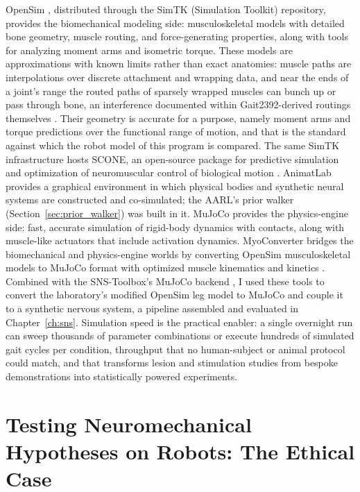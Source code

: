 OpenSim \citep{delp_opensim_2007, seth_opensim_2018}, distributed through the SimTK (Simulation Toolkit) repository, provides the biomechanical modeling side: musculoskeletal models with detailed bone geometry, muscle routing, and force-generating properties, along with tools for analyzing moment arms and isometric torque. These models are approximations with known limits rather than exact anatomies: muscle paths are interpolations over discrete attachment and wrapping data, and near the ends of a joint's range the routed paths of sparsely wrapped muscles can bunch up or pass through bone, an interference documented within Gait2392-derived routings themselves \citep{bolen_bipedal_2019}. Their geometry is accurate for a purpose, namely moment arms and torque predictions over the functional range of motion, and that is the standard against which the robot model of this program is compared. The same SimTK infrastructure hosts SCONE, an open-source package for predictive simulation and optimization of neuromuscular control of biological motion \citep{geijtenbeek_scone_2019}. AnimatLab \citep{cofer_animatlab_2010} provides a graphical environment in which physical bodies and synthetic neural systems are constructed and co-simulated; the AARL's prior walker (Section~\ref{sec:prior_walker}) was built in it. MuJoCo \citep{todorov_mujoco_2012} provides the physics-engine side: fast, accurate simulation of rigid-body dynamics with contacts, along with muscle-like actuators that include activation dynamics. MyoConverter bridges the biomechanical and physics-engine worlds by converting OpenSim musculoskeletal models to MuJoCo format with optimized muscle kinematics and kinetics \citep{caggiano_myosuite_2022, wang_myosim_2022}. Combined with the SNS-Toolbox's MuJoCo backend \citep{nourse_sns_2023}, I used these tools to convert the laboratory's modified OpenSim leg model to MuJoCo and couple it to a synthetic nervous system, a pipeline assembled and evaluated in Chapter~\ref{ch:sns}. Simulation speed is the practical enabler: a single overnight run can sweep thousands of parameter combinations or execute hundreds of simulated gait cycles per condition, throughput that no human-subject or animal protocol could match, and that transforms lesion and stimulation studies from bespoke demonstrations into statistically powered experiments.

\section{Testing Neuromechanical Hypotheses on Robots: The Ethical Case}\label{sec:bg_ethics}


